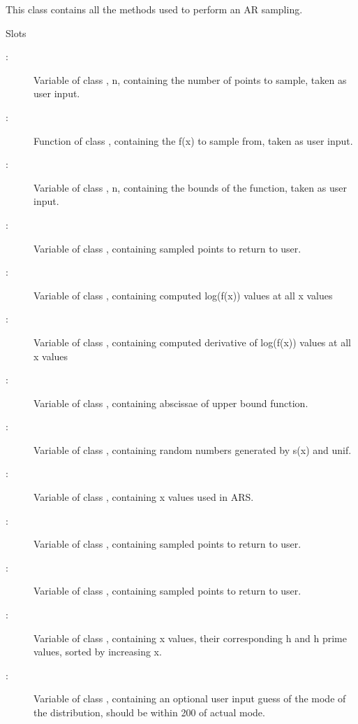 \documentclass[a4paper]{book}
\begin{document}
%
\begin{Description}\relax
This class contains all the methods used to perform an AR
sampling.
\end{Description}
%
\begin{Section}{Slots}
\begin{description}
 \item[:] Variable of class
, n, containing the number of points to
sample, taken as user input.\item[:] Function
of class , containing the f(x) to sample
from, taken as user input.
\item[:] Variable of class ,
n, containing the bounds of the function, taken as user
input.\item[:] Variable of class
, containing sampled points to return to
user.\item[:] Variable of class
, containing computed log(f(x)) values at
all x values\item[:] Variable of
class , containing computed derivative of
log(f(x)) values at all x values
\item[:] Variable of class ,
containing abscissae of upper bound function.
\item[:] Variable of class ,
containing random numbers generated by s(x) and unif.
\item[:] Variable of class ,
containing x values used in ARS.
\item[:] Variable of class ,
containing sampled points to return to user.
\item[:] Variable of class ,
containing sampled points to return to user.
\item[:] Variable of class
, containing x values, their corresponding
h and h prime values, sorted by increasing x.
\item[:] Variable of class
, containing an optional user input guess
of the mode of the distribution, should be within 200 of
actual mode.
\end{description}

\end{Section}
\end{document}
